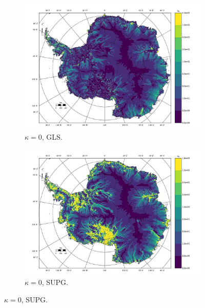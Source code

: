 \begin{figure}

  \centering

  \begin{subfigure}[b]{0.45\linewidth}
    \includegraphics[width=\linewidth]{images/balance_velocity/antarctica/Ubar_10H_kappa_0_GLS.jpg}
  \caption{$\kappa = 0$, GLS.}
  \label{antarctica_bv_image_kappa_0_GLS}
  \end{subfigure}
  \begin{subfigure}[b]{0.45\linewidth}
    \includegraphics[width=\linewidth]{images/balance_velocity/antarctica/Ubar_10H_kappa_0_SUPG.jpg}
  \caption{$\kappa = 0$, SUPG.}
  \label{antarctica_bv_image_kappa_0_SUPG}
  \end{subfigure}


\end{figure}
